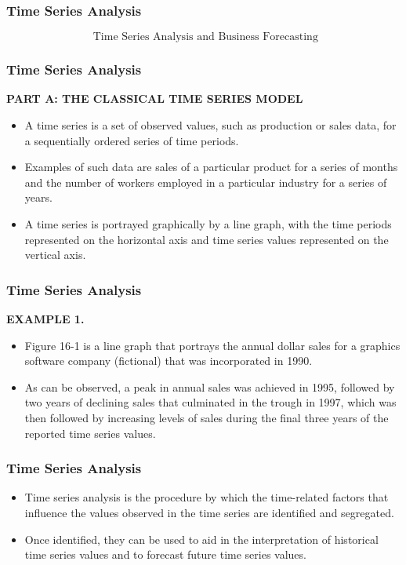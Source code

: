 \documentclass{beamer}
\begin{document}
\begin{frame}
\frametitle{Time Series Analysis}
\huge
\[ \mbox{ Time Series Analysis
and Business
Forecasting} \]

\end{frame}
\begin{frame}
\frametitle{Time Series Analysis}
\textbf{PART A: THE CLASSICAL TIME SERIES MODEL}
\begin{itemize}
\item A time series is a set of observed values, such as production or sales data, for a sequentially ordered series
of time periods. 
\item Examples of such data are sales of a particular product for a series of months and the number of
workers employed in a particular industry for a series of years. 
\item A time series is portrayed graphically by a line
graph, with the time periods represented on the horizontal axis and time series values
represented on the vertical axis.
\end{itemize}
\end{frame}
\begin{frame}
\frametitle{Time Series Analysis}
\textbf{EXAMPLE 1.}
\begin{itemize}
\item  Figure 16-1 is a line graph that portrays the annual dollar sales for a graphics software company (fictional)
that was incorporated in 1990. 
\item As can be observed, a peak in annual sales was achieved in 1995, followed by two years of
declining sales that culminated in the trough in 1997, which was then followed by increasing levels of sales during the
final three years of the reported time series values.
\end{itemize}
\end{frame}
\begin{frame}
\frametitle{Time Series Analysis}
\begin{itemize}
\item Time series analysis is the procedure by which the time-related factors that influence the values observed in
the time series are identified and segregated. 
\item Once identified, they can be used to aid in the interpretation of
historical time series values and to forecast future time series values. 
\end{itemize}
\end{frame}
\end{document}
